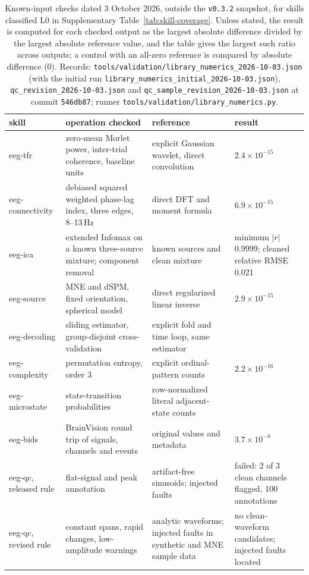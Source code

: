 \begin{table}[!htbp]
\centering\footnotesize
\caption{Known-input checks dated 3 October 2026, outside the \texttt{v0.3.2} snapshot, for skills classified L0 in Supplementary Table~\ref*{tab:skill-coverage}. Unless stated, the result is computed for each checked output as the largest absolute difference divided by the largest absolute reference value, and the table gives the largest such ratio across outputs; a control with an all-zero reference is compared by absolute difference (0). Records: \texttt{tools/validation/library\_numerics\_2026-10-03.json} (with the initial run \texttt{library\_numerics\_initial\_2026-10-03.json}), \texttt{qc\_revision\_2026-10-03.json} and \texttt{qc\_sample\_revision\_2026-10-03.json} at commit \texttt{546db87}; runner \texttt{tools/validation/library\_numerics.py}.}
\label{tab:knowninput}
\begin{tabular}{>{\raggedright\arraybackslash}p{2.3cm}>{\raggedright\arraybackslash}p{4.6cm}>{\raggedright\arraybackslash}p{4.0cm}>{\raggedright\arraybackslash}p{3.2cm}}
\toprule
skill & operation checked & reference & result \\
\midrule
eeg-tfr & zero-mean Morlet power, inter-trial coherence, baseline units & explicit Gaussian wavelet, direct convolution & \(2.4\times10^{-15}\) \\
eeg-connectivity & debiased squared weighted phase-lag index, three edges, 8--13\,Hz & direct DFT and moment formula & \(6.9\times10^{-15}\) \\
eeg-ica & extended Infomax on a known three-source mixture; component removal & known sources and clean mixture & minimum \(|r|\) 0.9999; cleaned relative RMSE 0.021 \\
eeg-source & MNE and dSPM, fixed orientation, spherical model & direct regularized linear inverse & \(2.9\times10^{-15}\) \\
eeg-decoding & sliding estimator, group-disjoint cross-validation & explicit fold and time loop, same estimator & 0 \\
eeg-complexity & permutation entropy, order 3 & explicit ordinal-pattern counts & \(2.2\times10^{-16}\) \\
eeg-microstate & state-transition probabilities & row-normalized literal adjacent-state counts & 0 \\
eeg-bids & BrainVision round trip of signals, channels and events & original values and metadata & \(3.7\times10^{-8}\) \\
eeg-qc, released rule & flat-signal and peak annotation & artifact-free sinusoids; injected faults & failed: 2 of 3 clean channels flagged, 100 annotations \\
eeg-qc, revised rule & constant spans, rapid changes, low-amplitude warnings & 27 analytic waveforms; injected faults in synthetic and MNE sample data & no clean-waveform candidates; injected faults located \\
\bottomrule
\end{tabular}
\end{table}
